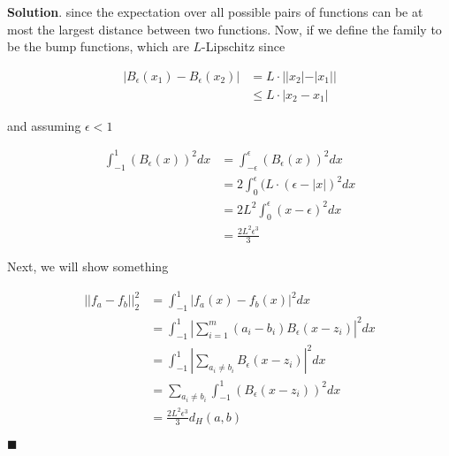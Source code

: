 \documentclass[12pt]{article}
\theoremstyle{definition}
\newenvironment{s}{%
        \begin{trivlist} \item \textbf{Solution}. }{%
            \hspace*{\fill} $\blacksquare$\end{trivlist}}%
\begin{document}
{\begin{s}
since the expectation over all possible pairs of functions can be at most the largest distance between two functions. Now, if we define the family to be the bump functions, which are $L$-Lipschitz since

\begin{align*}
|B_{\epsilon}(x_{1}) - B_{\epsilon}(x_{2})| &= L\cdot ||x_{2}|-|x_{1}||\\
&\leq L\cdot |x_{2}-x_{1}|
\end{align*}

and assuming $\epsilon < 1$

\begin{align*}
\int_{-1}^{1}(B_{\epsilon}(x))^{2}dx &= \int_{-\epsilon}^{\epsilon}(B_{\epsilon}(x))^{2}dx\\
&= 2\int_{0}^{\epsilon} (L\cdot (\epsilon-|x|)^{2}dx\\
&= 2L^{2}\int_{0}^{\epsilon} (x-\epsilon)^{2}dx\\
&= \frac{2L^{2}\epsilon^{3}}{3}
\end{align*}

Next, we will show something

\begin{align*}
||f_{a}-f_{b}||_{2}^{2} &= \int_{-1}^{1} |f_{a}(x)-f_{b}(x)|^{2}dx\\
&= \int_{-1}^{1} |\sum_{i=1}^{m}(a_{i}-b_{i})B_{\epsilon}(x-z_{i})|^{2}dx\\
&= \int_{-1}^{1} |\sum_{a_{i}\neq b_{i}}B_{\epsilon}(x-z_{i})|^{2}dx\\
&= \sum_{a_{i}\neq b_{i}}\int_{-1}^{1} \left(B_{\epsilon}(x-z_{i})\right)^{2}dx\\
&= \frac{2L^{2}\epsilon^{3}}{3}d_{H}(a,b)
\end{align*}

\end{s}
\end{document}
